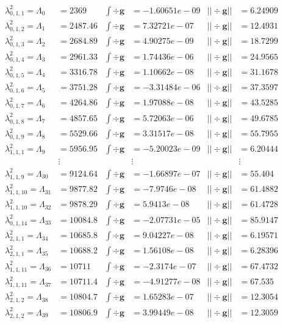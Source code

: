 \begin{align*}
\lambda^2_{0,1,1} = \Lambda_{0} &= 2369	& \int\div\bm{g} &= -1.60651e-09	& ||\div\bm{g}|| &= 6.24909\\
\lambda^2_{0,1,2} = \Lambda_{1} &= 2487.46	& \int\div\bm{g} &= 7.32721e-07	& ||\div\bm{g}|| &= 12.4931\\
\lambda^2_{0,1,3} = \Lambda_{2} &= 2684.89	& \int\div\bm{g} &= 4.90275e-09	& ||\div\bm{g}|| &= 18.7299\\
\lambda^2_{0,1,4} = \Lambda_{3} &= 2961.33	& \int\div\bm{g} &= 1.74436e-06	& ||\div\bm{g}|| &= 24.9565\\
\lambda^2_{0,1,5} = \Lambda_{4} &= 3316.78	& \int\div\bm{g} &= 1.10662e-08	& ||\div\bm{g}|| &= 31.1678\\
\lambda^2_{0,1,6} = \Lambda_{5} &= 3751.28	& \int\div\bm{g} &= -3.31484e-06	& ||\div\bm{g}|| &= 37.3597\\
\lambda^2_{0,1,7} = \Lambda_{6} &= 4264.86	& \int\div\bm{g} &= 1.97088e-08	& ||\div\bm{g}|| &= 43.5285\\
\lambda^2_{0,1,8} = \Lambda_{7} &= 4857.65	& \int\div\bm{g} &= 5.72063e-06	& ||\div\bm{g}|| &= 49.6785\\
\lambda^2_{0,1,9} = \Lambda_{8} &= 5529.66	& \int\div\bm{g} &= 3.31517e-08	& ||\div\bm{g}|| &= 55.7955\\
\lambda^2_{1,1,1} = \Lambda_{9} &= 5956.95	& \int\div\bm{g} &= -5.20023e-09	& ||\div\bm{g}|| &= 6.20444\\
&\vdots & &\vdots & &\vdots\\
\lambda^2_{1,1,9} = \Lambda_{30} &= 9124.64	& \int\div\bm{g} &= -1.66897e-07	& ||\div\bm{g}|| &= 55.404\\
\lambda^2_{1,1,10} = \Lambda_{31} &= 9877.82	& \int\div\bm{g} &= -7.9746e-08	& ||\div\bm{g}|| &= 61.4882\\
\lambda^2_{1,1,10} = \Lambda_{32} &= 9878.29	& \int\div\bm{g} &= 5.9413e-08	& ||\div\bm{g}|| &= 61.4728\\
\lambda^2_{0,1,14} = \Lambda_{33} &= 10084.8	& \int\div\bm{g} &= -2.07731e-05	& ||\div\bm{g}|| &= 85.9147\\
\lambda^2_{2,1,1} = \Lambda_{34} &= 10685.8	& \int\div\bm{g} &= 9.04227e-08	& ||\div\bm{g}|| &= 6.19571\\
\lambda^2_{2,1,1} = \Lambda_{35} &= 10688.2	& \int\div\bm{g} &= 1.56108e-08	& ||\div\bm{g}|| &= 6.28396\\
\lambda^2_{1,1,11} = \Lambda_{36} &= 10711	& \int\div\bm{g} &= -2.3174e-07	& ||\div\bm{g}|| &= 67.4732\\
\lambda^2_{1,1,11} = \Lambda_{37} &= 10711.4	& \int\div\bm{g} &= -4.91277e-08	& ||\div\bm{g}|| &= 67.535\\
\lambda^2_{2,1,2} = \Lambda_{38} &= 10804.7	& \int\div\bm{g} &= 1.65283e-07	& ||\div\bm{g}|| &= 12.3054\\
\lambda^2_{2,1,2} = \Lambda_{39} &= 10806.9	& \int\div\bm{g} &= 3.99449e-08	& ||\div\bm{g}|| &= 12.3059
\end{align*}

